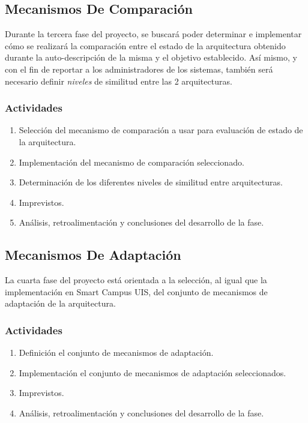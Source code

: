 \documentclass[12pt]{article}
\begin{document}
    \subsection{Mecanismos De Comparación}

    Durante la tercera fase del proyecto, se buscará poder determinar e implementar cómo se realizará la comparación entre el estado de la arquitectura obtenido durante la auto-descripción de la misma y el objetivo establecido. Así mismo, y con el fin de reportar a los administradores de los sistemas, también será necesario definir \textit{niveles} de similitud entre las 2 arquitecturas.

    \subsubsection*{Actividades}

    \begin{enumerate}[label=\thesubsection.\arabic*., wide, labelindent=2em, leftmargin=5em]
        \item Selección del mecanismo de comparación a usar para evaluación de estado de la arquitectura.
        \item Implementación del mecanismo de comparación seleccionado.
        \item Determinación de los diferentes niveles de similitud entre arquitecturas.
        \item Imprevistos.
        \item Análisis, retroalimentación y conclusiones del desarrollo de la fase. 
    \end{enumerate}    

    \subsection{Mecanismos De Adaptación}
    
    La cuarta fase del proyecto está orientada a la selección, al igual que la implementación en Smart Campus UIS, del conjunto de mecanismos de adaptación de la arquitectura. 

    \subsubsection{Actividades}

   \begin{enumerate}[label=\thesubsection.\arabic*., wide, labelindent=2em, leftmargin=5em]
        \item Definición el conjunto de mecanismos de adaptación.
        \item Implementación el conjunto de mecanismos de adaptación seleccionados.
        \item Imprevistos.
        \item Análisis, retroalimentación y conclusiones del desarrollo de la fase. 
    \end{enumerate}  
    
\end{document}
